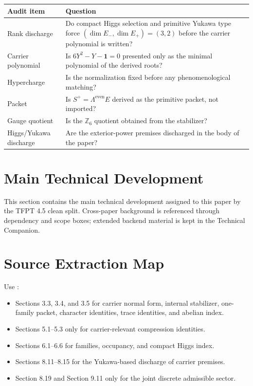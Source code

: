 \documentclass[11pt,a4paper]{article}
\begin{document}
\begin{center}
\begin{tabularx}{\textwidth}{@{}p{}Y@{}}
\toprule
\textbf{Audit item} & \textbf{Question} \\
\midrule
Rank discharge & Do compact Higgs selection and primitive Yukawa type force $(\dim E_-,\dim E_+)=(3,2)$ before the carrier polynomial is written? \\
Carrier polynomial & Is $6Y^2-Y-\mathbf 1=0$ presented only as the minimal polynomial of the derived roots? \\
Hypercharge & Is the normalization fixed before any phenomenological matching? \\
Packet & Is $S^+=\Lambda^{\mathrm{even}}E$ derived as the primitive packet, not imported? \\
Gauge quotient & Is the $\mathbb Z_6$ quotient obtained from the stabilizer? \\
Higgs/Yukawa discharge & Are the exterior-power premises discharged in the body of the paper? \\
\bottomrule
\end{tabularx}
\end{center}

\clearpage
\section{Main Technical Development}

This section contains the main technical development assigned to this paper by the TFPT 4.5 clean split. Cross-paper background is referenced through dependency and scope boxes; extended backend material is kept in the Technical Companion.



\section{Source Extraction Map}

\begin{tfptsourcebox}
Use \sourceDraft:
\begin{itemize}[leftmargin=1.5em]
    \item Sections 3.3, 3.4, and 3.5 for carrier normal form, internal stabilizer, one-family
    packet, character identities, trace identities, and abelian index.
    \item Sections 5.1--5.3 only for carrier-relevant compression identities.
    \item Sections 6.1--6.6 for families, occupancy, and compact Higgs index.
    \item Sections 8.11--8.15 for the Yukawa-based discharge of carrier premises.
    \item Section 8.19 and Section 9.11 only for the joint discrete admissible sector.
\end{itemize}
\end{tfptsourcebox}
\end{document}
